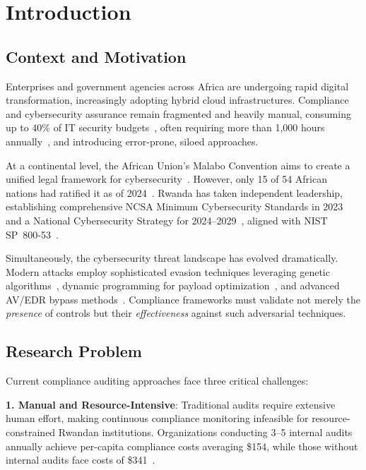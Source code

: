 \documentclass[futureinternet,article,submit,pdftex,moreauthors]{Definitions/mdpi}
\begin{document}
\section{Introduction}

\subsection{Context and Motivation}

Enterprises and government agencies across Africa are undergoing rapid digital transformation,
increasingly adopting hybrid cloud infrastructures. Compliance and cybersecurity assurance
remain fragmented and heavily manual, consuming up to 40\% of IT security budgets~\cite{ponemon_cost},
often requiring more than 1{,}000 hours annually~\cite{cogr_report}, and introducing
error-prone, siloed approaches.

At a continental level, the African Union's Malabo Convention aims to create a unified legal
framework for cybersecurity~\cite{malabo2014}. However, only 15 of 54 African nations had
ratified it as of 2024~\cite{au_cybersecurity_status}. Rwanda has taken independent leadership,
establishing comprehensive NCSA Minimum Cybersecurity Standards in 2023~\cite{ncsa2023} and a
National Cybersecurity Strategy for 2024--2029~\cite{rwanda_strategy_2024}, aligned with NIST
SP~800-53~\cite{nist2020}.

Simultaneously, the cybersecurity threat landscape has evolved dramatically. Modern attacks
employ sophisticated evasion techniques leveraging genetic algorithms~\cite{ga_xss_paper},
dynamic programming for payload optimization~\cite{dp_payload_paper}, and advanced AV/EDR
bypass methods~\cite{reverse_shell_paper,mitre_attack_sok}. Compliance frameworks must validate
not merely the \textit{presence} of controls but their \textit{effectiveness} against such
adversarial techniques.

\subsection{Research Problem}

Current compliance auditing approaches face three critical challenges:

\textbf{1. Manual and Resource-Intensive}: Traditional audits require extensive human effort,
making continuous compliance monitoring infeasible for resource-constrained Rwandan institutions.
Organizations conducting 3--5 internal audits annually achieve per-capita compliance costs
averaging \$154, while those without internal audits face costs of \$341~\cite{ponemon_cost}.
\end{document}
